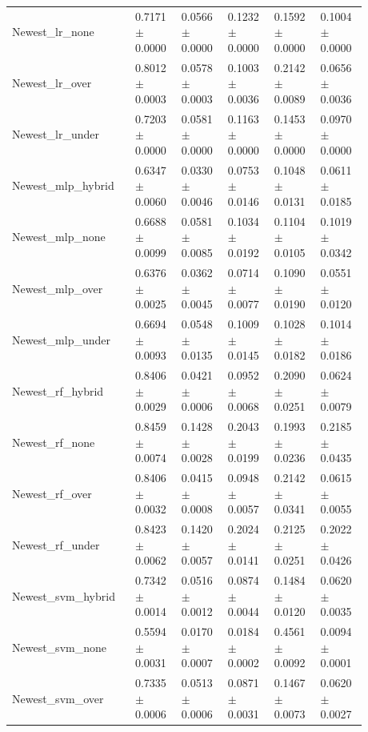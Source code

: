 \begin{longtable}{p{0.28\linewidth}p{0.12\linewidth}p{0.12\linewidth}p{0.12\linewidth}p{0.12\linewidth}p{0.12\linewidth}}
Newest\_\allowbreak{}lr\_\allowbreak{}none & 0.7171\(\pm\)0.0000 & 0.0566\(\pm\)0.0000 & 0.1232\(\pm\)0.0000 & 0.1592\(\pm\)0.0000 & 0.1004\(\pm\)0.0000 \\
Newest\_\allowbreak{}lr\_\allowbreak{}over & 0.8012\(\pm\)0.0003 & 0.0578\(\pm\)0.0003 & 0.1003\(\pm\)0.0036 & 0.2142\(\pm\)0.0089 & 0.0656\(\pm\)0.0036 \\
Newest\_\allowbreak{}lr\_\allowbreak{}under & 0.7203\(\pm\)0.0000 & 0.0581\(\pm\)0.0000 & 0.1163\(\pm\)0.0000 & 0.1453\(\pm\)0.0000 & 0.0970\(\pm\)0.0000 \\
Newest\_\allowbreak{}mlp\_\allowbreak{}hybrid & 0.6347\(\pm\)0.0060 & 0.0330\(\pm\)0.0046 & 0.0753\(\pm\)0.0146 & 0.1048\(\pm\)0.0131 & 0.0611\(\pm\)0.0185 \\
Newest\_\allowbreak{}mlp\_\allowbreak{}none & 0.6688\(\pm\)0.0099 & 0.0581\(\pm\)0.0085 & 0.1034\(\pm\)0.0192 & 0.1104\(\pm\)0.0105 & 0.1019\(\pm\)0.0342 \\
Newest\_\allowbreak{}mlp\_\allowbreak{}over & 0.6376\(\pm\)0.0025 & 0.0362\(\pm\)0.0045 & 0.0714\(\pm\)0.0077 & 0.1090\(\pm\)0.0190 & 0.0551\(\pm\)0.0120 \\
Newest\_\allowbreak{}mlp\_\allowbreak{}under & 0.6694\(\pm\)0.0093 & 0.0548\(\pm\)0.0135 & 0.1009\(\pm\)0.0145 & 0.1028\(\pm\)0.0182 & 0.1014\(\pm\)0.0186 \\
Newest\_\allowbreak{}rf\_\allowbreak{}hybrid & 0.8406\(\pm\)0.0029 & 0.0421\(\pm\)0.0006 & 0.0952\(\pm\)0.0068 & 0.2090\(\pm\)0.0251 & 0.0624\(\pm\)0.0079 \\
Newest\_\allowbreak{}rf\_\allowbreak{}none & 0.8459\(\pm\)0.0074 & 0.1428\(\pm\)0.0028 & 0.2043\(\pm\)0.0199 & 0.1993\(\pm\)0.0236 & 0.2185\(\pm\)0.0435 \\
Newest\_\allowbreak{}rf\_\allowbreak{}over & 0.8406\(\pm\)0.0032 & 0.0415\(\pm\)0.0008 & 0.0948\(\pm\)0.0057 & 0.2142\(\pm\)0.0341 & 0.0615\(\pm\)0.0055 \\
Newest\_\allowbreak{}rf\_\allowbreak{}under & 0.8423\(\pm\)0.0062 & 0.1420\(\pm\)0.0057 & 0.2024\(\pm\)0.0141 & 0.2125\(\pm\)0.0251 & 0.2022\(\pm\)0.0426 \\
Newest\_\allowbreak{}svm\_\allowbreak{}hybrid & 0.7342\(\pm\)0.0014 & 0.0516\(\pm\)0.0012 & 0.0874\(\pm\)0.0044 & 0.1484\(\pm\)0.0120 & 0.0620\(\pm\)0.0035 \\
Newest\_\allowbreak{}svm\_\allowbreak{}none & 0.5594\(\pm\)0.0031 & 0.0170\(\pm\)0.0007 & 0.0184\(\pm\)0.0002 & 0.4561\(\pm\)0.0092 & 0.0094\(\pm\)0.0001 \\
Newest\_\allowbreak{}svm\_\allowbreak{}over & 0.7335\(\pm\)0.0006 & 0.0513\(\pm\)0.0006 & 0.0871\(\pm\)0.0031 & 0.1467\(\pm\)0.0073 & 0.0620\(\pm\)0.0027 \\

\end{longtable}
